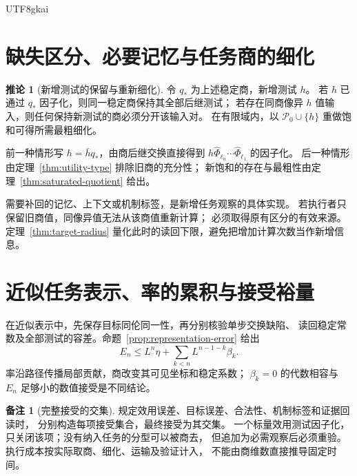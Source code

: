 \documentclass[12pt]{report}
\makeatletter
\theoremstyle{definition}
\newtheorem{corollary}{推论}[chapter]
\newtheorem{remark}{备注}[chapter]
\renewenvironment{proof}[1][\proofname]{\par
  \pushQED{\qed}\normalfont
  \topsep6\p@\@plus6\p@\relax
  \trivlist
  \item[\hskip\labelsep\normalfont #1\@addpunct{.}]\ignorespaces
}{
  \popQED\endtrivlist\@endpefalse
}
\makeatother
\begin{document}
\begin{CJK*}{UTF8}{gkai}
\section{缺失区分、必要记忆与任务商的细化}
\begin{corollary}[新增测试的保留与重新细化]
\label{cor:quotient-extension}
令 \(q_*\) 为上述稳定商，新增测试 \(h\)。
若 \(h\) 已通过 \(q_*\) 因子化，则同一稳定商保持其全部后继测试；
若存在同商像异 \(h\) 值输入，则任何保持新测试的商必须分开该输入对。
在有限域内，以 \(\mathcal P_0\cup\{h\}\) 重做饱和可得所需最粗细化。
\end{corollary}
\begin{proof}
前一种情形写 \(h=\bar hq_*\)，由商后继交换直接得到
\(h\widehat\Phi_{\ell_n}\cdots\widehat\Phi_{\ell_1}\) 的因子化。
后一种情形由定理~\ref{thm:utility-type} 排除旧商的充分性；
新饱和的存在与最粗性由定理~\ref{thm:saturated-quotient} 给出。
\end{proof}
需要补回的记忆、上下文或机制标签，是新增任务观察的具体实现。
若执行者只保留旧商值，同像异值无法从该商值重新计算；
必须取得原有区分的有效来源。定理~\ref{thm:target-radius}
量化此时的读回下限，避免把增加计算次数当作新增信息。

\section{近似任务表示、率的累积与接受裕量}
在近似表示中，先保存目标同伦同一性，再分别核验单步交换缺陷、
读回稳定常数及全部测试的容差。命题~\ref{prop:representation-error} 给出
\[
E_n\le L^n\eta+\sum_{k<n}L^{n-1-k}\beta_k.
\]
率沿路径传播局部贡献，商改变其可见坐标和稳定系数；
\(\beta_k=0\) 的代数相容与 \(E_n\) 足够小的数值接受是不同结论。
\begin{remark}[完整接受的交集]
规定效用误差、目标误差、合法性、机制标签和证据回读时，
分别构造每项接受集合，最终接受为其交集。
一个标量效用测试因子化，只关闭该项；没有纳入任务的分型可以被商去，
但追加为必需观察后必须重验。执行成本按实际取商、细化、运输及验证计入，
不能由商维数直接推导固定时间。
\end{remark}


\end{CJK*}
\end{document}
